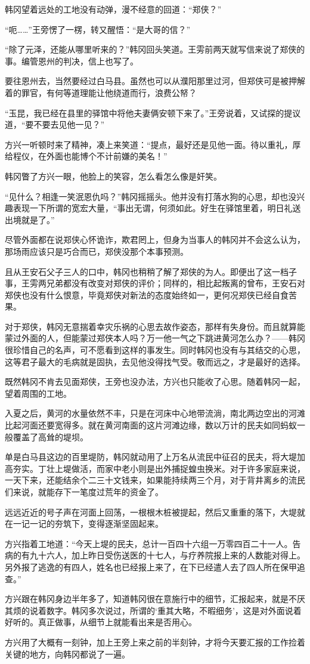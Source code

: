 韩冈望着远处的工地没有动弹，漫不经意的回道：“郑侠？”

“呃……”王旁愣了一楞，转又醒悟：“是大哥的信？”

“除了元泽，还能从哪里听来的？”韩冈回头笑道。王雱前两天就写信来说了郑侠的事。编管恩州的判决，信上也写了。

要往恩州去，当然要经过白马县。虽然也可以从濮阳那里过河，但郑侠可是被押解着的罪官，有何等道理能让他绕道而行，浪费公帑？

“玉昆，我已经在县里的驿馆中将他夫妻俩安顿下来了。”王旁说着，又试探的提议道，“要不要去见他一见？”

方兴一听顿时来了精神，凑上来笑道：“提点，最好还是见他一面。待以重礼，厚给程仪，在外面也能博个不计前嫌的美名！”

韩冈瞥了方兴一眼，他脸上的笑容，怎么看怎么像是奸笑。

“见什么？相逢一笑泯恩仇吗？”韩冈摇摇头。他并没有打落水狗的心思，却也没兴趣表现一下所谓的宽宏大量，“事出无谓，何须如此。好生在驿馆里着，明日礼送出境就是了。”

尽管外面都在说郑侠心怀诡诈，欺君罔上，但身为当事人的韩冈并不会这么认为，那场雨应该只是巧合而已，郑侠没那个本事预测。

且从王安石父子三人的口中，韩冈也稍稍了解了郑侠的为人。即便出了这一档子事，王雱两兄弟都没有改变对郑侠的评价；同样的，相比起叛离的曾布，王安石对郑侠也没有什么恨意，毕竟郑侠对新法的态度始终如一，更何况郑侠已经自食苦果。

对于郑侠，韩冈无意揣着幸灾乐祸的心思去故作姿态，那样有失身份。而且就算能蒙过外面的人，但能蒙过郑侠本人吗？万一他一气之下跳进黄河怎么办？——韩冈很珍惜自己的名声，可不愿看到这样的事发生。同时韩冈也没有与其结交的心思，这等君子最大的毛病就是固执，去见他没得找气受。敬而远之，才是最好的选择。

既然韩冈不肯去见面郑侠，王旁也没办法，方兴也只能收了心思。随着韩冈一起，望着周围的工地。

入夏之后，黄河的水量依然不丰，只是在河床中心地带流淌，南北两边空出的河滩比起河面还要宽得多。就在黄河南面的这片河滩边缘，数以万计的民夫如同蚂蚁一般覆盖了高耸的堤坝。

单是白马县这边的百里堤防，韩冈就动用了上万名从流民中征召的民夫，将大堤加高夯实。丁壮上堤做活，而家中老小则是出外捕捉蝗虫换米。对于许多家庭来说，一天下来，还能结余个二三十文钱来，如果能持续两三个月，对于背井离乡的流民们来说，就能存下一笔度过荒年的资金了。

远远近近的号子声在河面上回荡，一根根木桩被提起，然后又重重的落下，大堤就在一记一记的夯筑下，变得逐渐坚固起来。

方兴指着工地道：“今天上堤的民夫，总计一百四十六组一万零四百二十一人。告病的有九十六人，加上昨日受伤送医的十七人，与疗养院报上来的人数能对得上。另外报了逃逸的有四人，姓名也已经报上来了，在下已经遣人去了四人所在保甲追查。”

方兴跟在韩冈身边半年多了，知道韩冈很在意施行中的细节，汇报起来，就是不厌其烦的说着数字。韩冈多次说过，所谓的‘重其大略，不暇细务’，这是对外面说着好听的。真正做事，从细节上就能看出来是否用心。

方兴用了大概有一刻钟，加上王旁上来之前的半刻钟，才将今天要汇报的工作捡着关键的地方，向韩冈都说了一遍。

